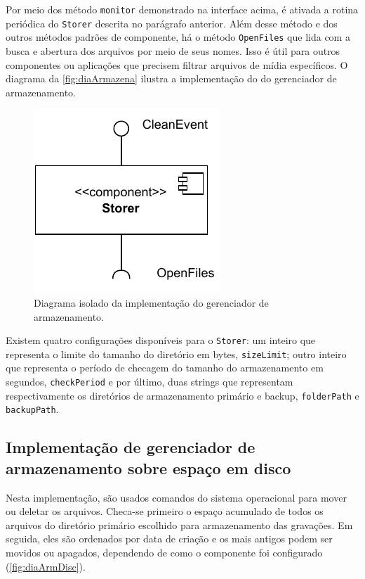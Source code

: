 \documentclass[12pt, %
openright, 
oneside, %
a4paper,    %
brazil]{facom-ufu-abntex2}
\begin{document}
Por meio dos método \texttt{monitor} demonstrado na interface acima, é ativada
a rotina periódica do \texttt{Storer} descrita no parágrafo anterior. Além
desse método e dos outros métodos padrões de componente, há o método
\texttt{OpenFiles} que lida com a busca e abertura dos arquivos por
meio de seus nomes. Isso é útil para outros componentes ou aplicações que
precisem filtrar arquivos de mídia específicos. O diagrama da
\autoref{fig:diaArmazena} ilustra a implementação do do gerenciador de
armazenamento.

\begin{figure}[!ht]
	\centering
	\includegraphics[width=0.3\linewidth]{storer.pdf}
	\caption[Diagrama isolado da implementação do gerenciador de
		armazenamento]{Diagrama isolado da implementação do gerenciador de
		armazenamento.}
	\label{fig:diaArmazena}
\end{figure}

Existem quatro configurações disponíveis para o \texttt{Storer}: um inteiro que
representa o limite do tamanho do diretório em bytes, \texttt{sizeLimit}; outro
inteiro que representa o período de checagem do tamanho do armazenamento em
segundos, \texttt{checkPeriod} e por último, duas strings que representam
respectivamente os diretórios de armazenamento primário e backup,
\texttt{folderPath} e \texttt{backupPath}.

\subsection{Implementação de gerenciador de armazenamento sobre espaço em
	disco}

Nesta implementação, são usados comandos do sistema operacional para mover ou
deletar os arquivos. Checa-se primeiro o espaço acumulado de todos os arquivos
do diretório primário escolhido para armazenamento das gravações. Em seguida,
eles são ordenados por data de criação e os mais antigos podem ser movidos ou
apagados, dependendo de como o componente foi configurado
(\autoref{fig:diaArmDisc}).
\end{document}
